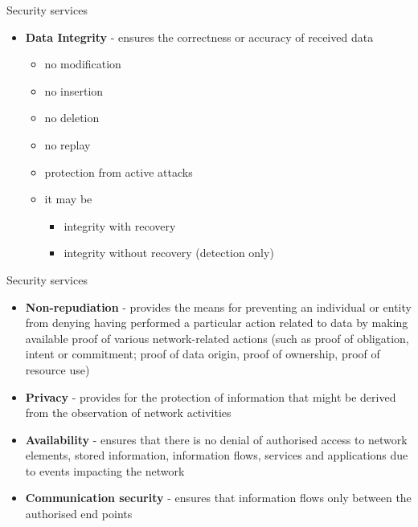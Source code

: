 \documentclass[pdf]{beamer}
\begin{document}
\begin{frame}{Security services}
\begin{itemize}
\item
\textbf{Data Integrity} - ensures the correctness or accuracy of received data
\begin{itemize}
\item
no modification
\item
no insertion
\item
no deletion
\item
no replay
\item
protection from active attacks
\item
it may be
\begin{itemize}
\item
integrity with recovery
\item
integrity without recovery (detection only)
\end{itemize}
\end{itemize}
\end{itemize}
\end{frame}


 
\begin{frame}{Security services}
\begin{itemize}
\item
\textbf{Non-repudiation} - provides the means for preventing an individual or entity from denying having performed a particular action related to data by making available proof of various network-related actions (such as proof of obligation, intent or
commitment; proof of data origin, proof of ownership, proof of resource use)
\item
\textbf{Privacy} - provides for the protection of information that might be derived from the observation of network activities
\item
\textbf{Availability} - ensures that there is no denial of authorised access to network elements, stored information, information flows, services and applications due to events impacting the network
\item 
\textbf{Communication security} - ensures that information flows only between the authorised end points
\end{itemize}
\end{frame}
\end{document}

